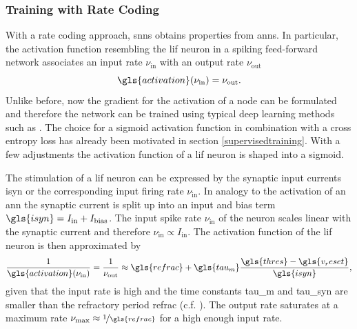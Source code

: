 \subsubsection*{Training with Rate Coding}
With a rate coding approach, \glspl{snn} obtains properties from \glspl{ann}. In particular, the activation function resembling the \gls{lif} neuron in a spiking feed-forward network associates an input rate $\nu_{\text{in}}$ with an output rate $\nu_{\text{out}}$
\begin{equation*}
	\gls{activation}(\nu_{\text{in}}) = \nu_\text{out}.
\end{equation*}
Unlike before, now the gradient for the activation of a node can be formulated and therefore the network can be trained using typical deep learning methods such as . The choice for a sigmoid activation function in combination with a cross entropy loss has already been motivated in section \cref{supervisedtraining}. With a few adjustments the activation function of a \gls{lif} neuron is shaped into a sigmoid.


The stimulation of a \gls{lif} neuron can be expressed by the synaptic input currents \gls{isyn} or the corresponding input firing rate $\nu_\text{in}$. In analogy to the activation of an \gls{ann} the synaptic current is split up into an input and bias term $\gls{isyn} = I_\text{in} + I_\text{bias}$. The input spike rate $\nu_\text{in}$ of the neuron scales linear with the synaptic current and therefore $\nu_\text{in} \propto I_\text{in}$. The activation function of the \gls{lif} neuron is then approximated by 
\begin{equation}
\frac{1}{\gls{activation}(\nu_\text{in})} = \frac{1}{\nu_\text{out}} \approx \gls{refrac} + \gls{tau_m} \frac{\gls{thres} - \gls{v_reset}}{\gls{isyn}},
\label{fireratehigh}
\end{equation}
given that the input rate is high and the time constants \gls{tau_m} and \gls{tau_syn} are smaller than the refractory period \gls{refrac} (c.f. \citealp{brunel2000dynamics}). The output rate saturates at a maximum rate $\nu_\text{max} \approx \nicefrac{1}{\gls{refrac}}$ for a high enough input rate.

